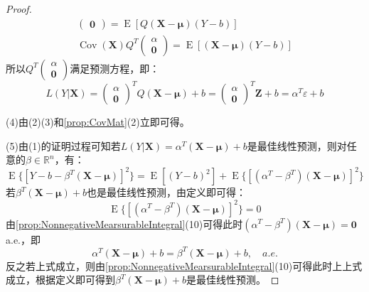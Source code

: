 \begin{proof}
\begin{gather*}
\begin{pmatrix}
			\mathbf{0}	
		\end{pmatrix}=\operatorname{E}[Q(\mathbf{X}-\boldsymbol{\mu})(Y-b)] \\
		\operatorname{Cov}(\mathbf{X})Q^T
		\begin{pmatrix}
			\alpha \\
			\mathbf{0}	
		\end{pmatrix}=\operatorname{E}[(\mathbf{X}-\boldsymbol{\mu})(Y-b)] 
	\end{gather*}
	所以$Q^T
	\begin{pmatrix}
		\alpha \\
		\mathbf{0}
	\end{pmatrix}$满足预测方程，即：
	\begin{equation*}
		L(Y|\mathbf{X})=
		\begin{pmatrix}
			\alpha \\
			\mathbf{0}
		\end{pmatrix}^TQ(\mathbf{X}-\boldsymbol{\mu})+b=
		\begin{pmatrix}
		\alpha \\
		\mathbf{0}
		\end{pmatrix}^T\mathbf{Z}+b=\alpha^T\varepsilon+b
	\end{equation*}\par
	(4)由(2)(3)和\cref{prop:CovMat}(2)立即可得。\par
	(5)由(1)的证明过程可知若$L(Y|\mathbf{X})=\alpha^T(\mathbf{X}-\boldsymbol{\mu})+b$是最佳线性预测，则对任意的$\beta\in\mathbb{R}^{n}$，有：
	\begin{equation*}
		\operatorname{E}\{[Y-b-\beta^T(\mathbf{X}-\boldsymbol{\mu})]^2\}=\operatorname{E}[(Y-b)^2]+\operatorname{E}\{[(\alpha^T-\beta^T)(\mathbf{X}-\boldsymbol{\mu})]^2\}
	\end{equation*}
	若$\beta^T(\mathbf{X}-\boldsymbol{\mu})+b$也是最佳线性预测，由定义即可得：
	\begin{equation*}
		\operatorname{E}\{[(\alpha^T-\beta^T)(\mathbf{X}-\boldsymbol{\mu})]^2\}=0
	\end{equation*}
	由\cref{prop:NonnegativeMearsurableIntegral}(10)可得此时$(\alpha^T-\beta^T)(\mathbf{X}-\boldsymbol{\mu})=\mathbf{0}\;$a.e.，即
	\begin{equation*}
		\alpha^T(\mathbf{X}-\boldsymbol{\mu})+b=\beta^T(\mathbf{X}-\boldsymbol{\mu})+b,\quad a.e.
	\end{equation*}
	反之若上式成立，则由\cref{prop:NonnegativeMearsurableIntegral}(10)可得此时上上式成立，根据定义即可得到$\beta^T(\mathbf{X}-\boldsymbol{\mu})+b$是最佳线性预测。\par

\end{proof}
